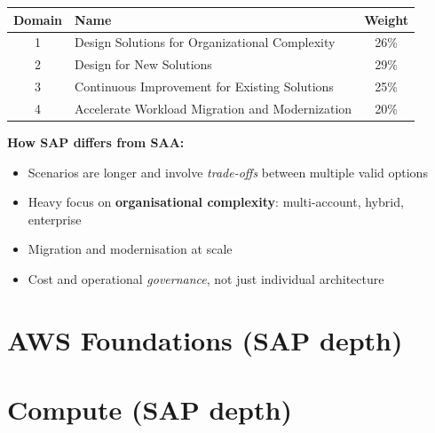 \documentclass[12pt, a4paper]{article}
\begin{document}
\begin{comparebox}[title={SAP-C02 content domains}]
\begin{tabular}{@{}clc@{}}
\toprule
\textbf{Domain} & \textbf{Name} & \textbf{Weight} \\
\midrule
1 & Design Solutions for Organizational Complexity    & 26\% \\
2 & Design for New Solutions                          & 29\% \\
3 & Continuous Improvement for Existing Solutions     & 25\% \\
4 & Accelerate Workload Migration and Modernization   & 20\% \\
\bottomrule
\end{tabular}
\end{comparebox}

\textbf{How SAP differs from SAA:}
\begin{itemize}
  \item Scenarios are longer and involve \emph{trade-offs} between multiple valid options
  \item Heavy focus on \textbf{organisational complexity}: multi-account, hybrid, enterprise
  \item Migration and modernisation at scale
  \item Cost and operational \emph{governance}, not just individual architecture
\end{itemize}

\newpage

\part{AWS Foundations (SAP depth)}




\part{Compute (SAP depth)}






\end{document}
